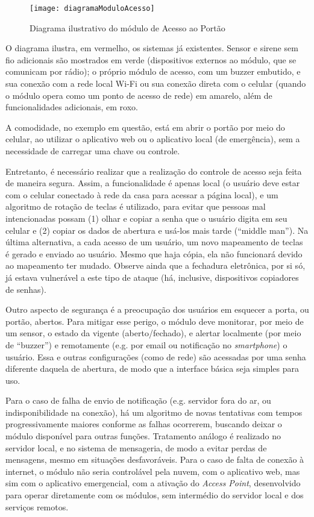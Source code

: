 \begin{figure}[H]
	\centering
	\caption{Diagrama ilustrativo do módulo de Acesso ao Portão}
  \texttt{[image: diagramaModuloAcesso]}
\label{fig:diagramaModuloAcesso}
\end{figure}

O diagrama ilustra, em vermelho, os sistemas já existentes. Sensor e sirene sem fio adicionais são mostrados em verde (dispositivos externos ao módulo, que se comunicam por rádio); o próprio módulo de acesso, com um buzzer embutido, e sua conexão com a rede local Wi-Fi ou sua conexão direta com o celular (quando o módulo opera como um ponto de acesso de rede) em amarelo, além de funcionalidades adicionais, em roxo.

A comodidade, no exemplo em questão, está em abrir o portão por meio do celular, ao utilizar o aplicativo web ou o aplicativo local (de emergência), sem a necessidade de carregar uma chave ou controle.

Entretanto, é necessário realizar que a realização do controle de acesso seja feita de maneira segura. Assim, a funcionalidade é apenas local (o usuário deve estar com o celular conectado à rede da casa para acessar a página local), e um algoritmo de rotação de teclas é utilizado, para evitar que pessoas mal intencionadas possam (1) olhar e copiar a senha que o usuário digita em seu celular e (2) copiar os dados de abertura e usá-los mais tarde (“middle man”). Na última alternativa, a cada acesso de um usuário, um novo mapeamento de teclas é gerado e enviado ao usuário. Mesmo que haja cópia, ela não funcionará devido ao mapeamento ter mudado. Observe ainda que a fechadura eletrônica, por si só, já estava vulnerável a este tipo de ataque (há, inclusive, dispositivos copiadores de senhas).

Outro aspecto de segurança é a preocupação dos usuários em esquecer a porta, ou portão, abertos. Para mitigar esse perigo, o módulo deve monitorar, por meio de um sensor, o estado da vigente (aberto/fechado), e alertar localmente (por meio de “buzzer”) e remotamente (e.g. por email ou notificação no \textit{smartphone}) o usuário. Essa e outras configurações (como de rede) são acessadas por uma senha diferente daquela de abertura, de modo que a interface básica seja simples para uso.

Para o caso de falha de envio de notificação (e.g. servidor fora do ar, ou indisponibilidade na conexão), há um algoritmo de novas tentativas com tempos progressivamente maiores conforme as falhas ocorrerem, buscando deixar o módulo disponível para outras funções. Tratamento análogo é realizado no servidor local, e no sistema de mensageria, de modo a evitar perdas de mensagens, mesmo em situações desfavoráveis. Para o caso de falta de conexão à internet, o módulo não seria controlável pela nuvem, com o aplicativo web, mas sim com o aplicativo emergencial, com a ativação do \textit{Access Point}, desenvolvido para operar diretamente com os módulos, sem intermédio do servidor local e dos serviços remotos.

